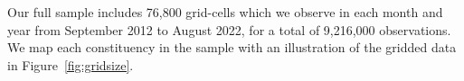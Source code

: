 \documentclass[12pt]{article}
\begin{document}
Our full sample includes 76,800 grid-cells which we observe in each month and year from September 2012 to August 2022, for a total of 9,216,000 observations. We map each constituency in the sample with an illustration of the gridded data in Figure~\ref{fig:gridsize}.
\end{document}
